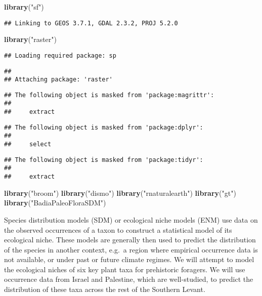 \documentclass[]{article}
\newenvironment{Shaded}{\begin{snugshade}}{\end{snugshade}}
\newcommand{\KeywordTok}[1]{\textcolor[rgb]{0.13,0.29,0.53}{\textbf{#1}}}
\newcommand{\NormalTok}[1]{#1}
\newcommand{\StringTok}[1]{\textcolor[rgb]{0.31,0.60,0.02}{#1}}
\begin{document}
\begin{Shaded}
\begin{Highlighting}[]
\KeywordTok{library}\NormalTok{(}\StringTok{"sf"}\NormalTok{)}
\end{Highlighting}
\end{Shaded}

\begin{verbatim}
## Linking to GEOS 3.7.1, GDAL 2.3.2, PROJ 5.2.0
\end{verbatim}

\begin{Shaded}
\begin{Highlighting}[]
\KeywordTok{library}\NormalTok{(}\StringTok{"raster"}\NormalTok{)}
\end{Highlighting}
\end{Shaded}

\begin{verbatim}
## Loading required package: sp
\end{verbatim}

\begin{verbatim}
## 
## Attaching package: 'raster'
\end{verbatim}

\begin{verbatim}
## The following object is masked from 'package:magrittr':
## 
##     extract
\end{verbatim}

\begin{verbatim}
## The following object is masked from 'package:dplyr':
## 
##     select
\end{verbatim}

\begin{verbatim}
## The following object is masked from 'package:tidyr':
## 
##     extract
\end{verbatim}

\begin{Shaded}
\begin{Highlighting}[]
\KeywordTok{library}\NormalTok{(}\StringTok{"broom"}\NormalTok{)}
\KeywordTok{library}\NormalTok{(}\StringTok{"dismo"}\NormalTok{)}
\KeywordTok{library}\NormalTok{(}\StringTok{"rnaturalearth"}\NormalTok{)}
\KeywordTok{library}\NormalTok{(}\StringTok{"gt"}\NormalTok{)}
\KeywordTok{library}\NormalTok{(}\StringTok{"BadiaPaleoFloraSDM"}\NormalTok{)}
\end{Highlighting}
\end{Shaded}

Species distribution models (SDM) or ecological niche models (ENM) use
data on the observed occurrences of a taxon to construct a statistical
model of its ecological niche. These models are generally then used to
predict the distribution of the species in another context, e.g.~a
region where empirical occurrence data is not available, or under past
or future climate regimes. We will attempt to model the ecological
niches of six key plant taxa for prehistoric foragers. We will use
occurrence data from Israel and Palestine, which are well-studied, to
predict the distribution of these taxa across the rest of the Southern
Levant.
\end{document}
